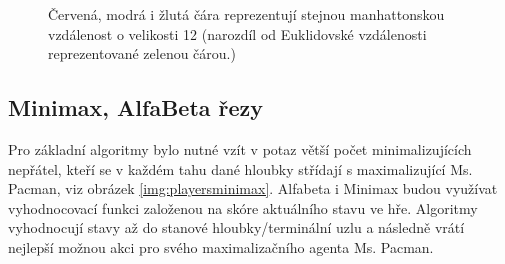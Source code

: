 \begin{figure}[!htbp]
\begin{center}
	\caption{Červená, modrá i žlutá čára reprezentují stejnou manhattonskou vzdálenost o velikosti 12 (narozdíl od Euklidovské vzdálenosti reprezentované zelenou čárou.)}
	\label{img:manhattanDist}
\end{center}
\end{figure}

\subsection{Minimax, AlfaBeta řezy}
Pro základní algoritmy bylo nutné vzít v potaz větší počet minimalizujících nepřátel, kteří se v každém tahu dané hloubky střídají s maximalizující Ms. Pacman, viz obrázek \ref{img:playersminimax}. Alfabeta i Minimax budou využívat vyhodnocovací funkci založenou na skóre aktuálního stavu ve hře. Algoritmy vyhodnocují stavy až do stanové hloubky/terminální uzlu a následně vrátí nejlepší možnou akci pro svého maximalizačního agenta Ms. Pacman.

